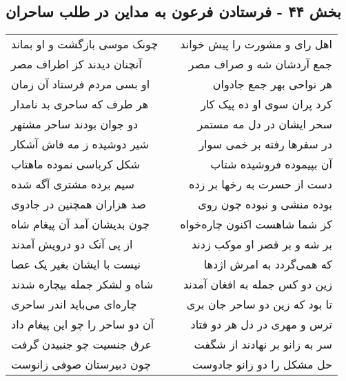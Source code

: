 \begin{center}
\section*{بخش ۴۴ - فرستادن فرعون به مداین در طلب ساحران}
\label{sec:sh044}
\begin{longtable}{l p{0.5cm} r}
چونک موسی بازگشت و او بماند
&&
اهل رای و مشورت را پیش خواند
\\
آنچنان دیدند کز اطراف مصر
&&
جمع آردشان شه و صراف مصر
\\
او بسی مردم فرستاد آن زمان
&&
هر نواحی بهر جمع جادوان
\\
هر طرف که ساحری بد نامدار
&&
کرد پران سوی او ده پیک کار
\\
دو جوان بودند ساحر مشتهر
&&
سحر ایشان در دل مه مستمر
\\
شیر دوشیده ز مه فاش آشکار
&&
در سفرها رفته بر خمی سوار
\\
شکل کرباسی نموده ماهتاب
&&
آن بپیموده فروشیده شتاب
\\
سیم برده مشتری آگه شده
&&
دست از حسرت به رخها بر زده
\\
صد هزاران همچنین در جادوی
&&
بوده منشی و نبوده چون روی
\\
چون بدیشان آمد آن پیغام شاه
&&
کز شما شاهست اکنون چاره‌خواه
\\
از پی آنک دو درویش آمدند
&&
بر شه و بر قصر او موکب زدند
\\
نیست با ایشان بغیر یک عصا
&&
که همی‌گردد به امرش اژدها
\\
شاه و لشکر جمله بیچاره شدند
&&
زین دو کس جمله به افغان آمدند
\\
چاره‌ای می‌باید اندر ساحری
&&
تا بود که زین دو ساحر جان بری
\\
آن دو ساحر را چو این پیغام داد
&&
ترس و مهری در دل هر دو فتاد
\\
عرق جنسیت چو جنبیدن گرفت
&&
سر به زانو بر نهادند از شگفت
\\
چون دبیرستان صوفی زانوست
&&
حل مشکل را دو زانو جادوست
\\
\end{longtable}
\end{center}
